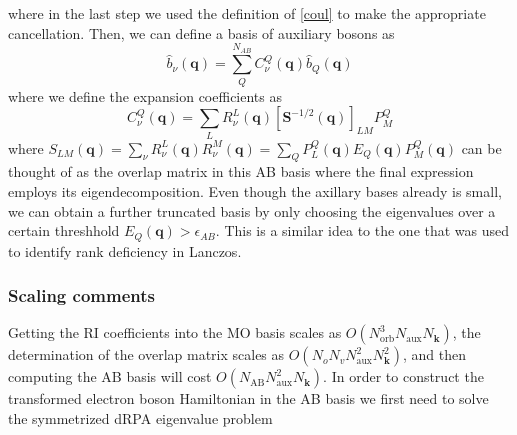 where in the last step we used the definition of \ref{coul} to make the appropriate cancellation. Then, we can define a basis of auxiliary bosons as
\begin{equation}
    \hat{b}_\nu(\mathbf{q}) = \sum_Q^{N_{AB}} C_\nu^Q(\mathbf{q}) \hat{b}_Q(\mathbf{q})
\end{equation}
where we define the expansion coefficients as
\begin{equation}
    C_\nu^Q(\mathbf{q}) = \sum_L R_\nu^L(\mathbf{q})\left[\bm{S}^{-1 / 2}(\mathbf{q})\right]_{L M} P_M^Q
\end{equation}
where $S_{L M}(\mathbf{q}) = \sum_\nu R_\nu^L(\mathbf{q}) R_\nu^M(\mathbf{q})= \sum_Q P_L^Q (\mathbf{q}) E_Q(\mathbf{q}) P_M^Q(\mathbf{q})$ can be thought of as the overlap matrix in this AB basis where the final expression employs its eigendecomposition. Even though the axillary bases already is small, we can obtain a further truncated basis by only choosing the eigenvalues over a certain threshhold $E_Q(\mathbf{q}) > \epsilon_{AB}$. This is a similar idea to the one that was used to identify rank deficiency in Lanczos. 
\subsubsection{Scaling comments}
Getting the RI coefficients into the MO basis scales as $O(N_{\text{orb}}^3N_{\text{aux}}N_{\mathbf{k}})$, the determination of the overlap matrix scales as $O(N_oN_vN_{\text{aux}}^2N_{\mathbf{k}}^2)$, and then computing the AB basis will cost $O(N_{\text{AB}}N_{\text{aux}}^2N_{\mathbf{k}})$. In order to construct the transformed electron boson Hamiltonian in the AB basis we first need to solve the symmetrized dRPA eigenvalue problem 




